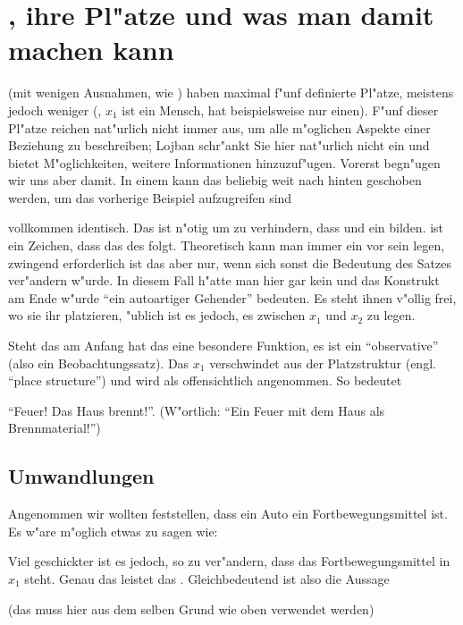 \section{, ihre Pl"atze und was man damit machen kann}
 (mit wenigen Ausnahmen, wie ) haben maximal f"unf definierte Pl"atze, meistens jedoch weniger (, $x_1$ ist ein Mensch, hat beispielsweise nur einen). F"unf dieser Pl"atze reichen nat"urlich nicht immer aus, um alle m"oglichen Aspekte einer Beziehung zu beschreiben; Lojban schr"ankt Sie hier nat"urlich nicht ein und
bietet M"oglichkeiten, weitere Informationen hinzuzuf"ugen. Vorerst begn"ugen wir uns aber damit.
In einem  kann das  beliebig weit nach hinten geschoben werden, um das vorherige Beispiel aufzugreifen sind
\begin{quote}
\end{quote}
vollkommen identisch. Das  ist n"otig um zu verhindern, dass  und  ein  bilden.  ist ein Zeichen, dass das  des
 folgt. Theoretisch kann man immer ein  vor sein  legen, zwingend erforderlich ist das aber nur, wenn sich sonst
die Bedeutung des Satzes ver"andern w"urde. In diesem Fall h"atte man hier gar kein  und das Konstrukt am Ende w"urde ``ein autoartiger Gehender'' bedeuten.
Es steht ihnen v"ollig frei, wo sie ihr  platzieren, "ublich ist es jedoch, es zwischen $x_1$ und $x_2$ zu legen.

Steht das  am Anfang hat das  eine besondere Funktion, es ist ein ``observative'' (also ein Beobachtungssatz). Das $x_1$ verschwindet aus der Platzstruktur
(engl. ``place structure'') und wird als offensichtlich angenommen. So bedeutet
\begin{quote}
\end{quote}
``Feuer! Das Haus brennt!''. (W"ortlich: ``Ein Feuer mit dem Haus als Brennmaterial!'')

\subsection{Umwandlungen}
Angenommen wir wollten feststellen, dass ein Auto ein Fortbewegungsmittel ist. Es w"are m"oglich etwas zu sagen wie:
\begin{quote}
\end{quote}
Viel geschickter ist es jedoch,  so zu ver"andern, dass das Fortbewegungsmittel in $x_1$ steht. Genau das leistet das  .
Gleichbedeutend ist also die Aussage
\begin{quote}
\end{quote}
(das  muss hier aus dem selben Grund wie oben verwendet werden)

